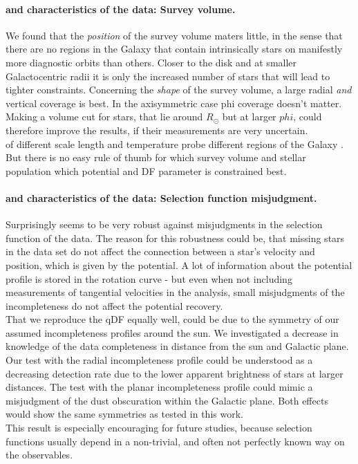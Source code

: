 \paragraph{\RM and characteristics of the data: Survey volume.} We found that the \emph{position} of the survey volume maters little, in the sense that there are no regions in the Galaxy that contain intrinsically stars on manifestly more diagnostic orbits than others. Closer to the disk and at smaller Galactocentric radii it is only the increased number of stars that will lead to tighter constraints. Concerning the \emph{shape} of the survey volume, a large radial \emph{and} vertical coverage is best. In the axisymmetric case phi coverage doesn't matter. Making a volume cut for stars, that lie around $R_\odot$ but at larger $phi$, could therefore improve the results, if their measurements are very uncertain.
\\\MAPs of different scale length and temperature probe different regions of the Galaxy \citep{bov13}. But there is no easy rule of thumb for which survey volume and stellar population which potential and DF parameter is constrained best.

\paragraph{\RM and characteristics of the data: Selection function misjudgment.} Surprisingly \RM seems to be very robust against misjudgments in the selection function of the data. The reason for this robustness could be, that missing stars in the data set do not affect the connection between a star's velocity and position, which is given by the potential. A lot of information about the potential profile is stored in the rotation curve - but even when not including measurements of tangential velocities in the analysis, small misjudgments of the incompleteness do not affect the potential recovery. 
\\That we reproduce the qDF equally well, could be due to the symmetry of our assumed incompleteness profiles around the sun. We investigated a decrease in knowledge of the data completeness in distance from the sun and Galactic plane. Our test with the radial incompleteness profile could be understood as a decreasing detection rate due to the lower apparent brightness of stars at larger distances. The test with the planar incompleteness profile could mimic a misjudgment of the dust obscuration within the Galactic plane. Both effects would show the same symmetries as tested in this work. 
\\This result is especially encouraging for future studies, because selection functions usually depend in a non-trivial, and often not perfectly known way on the observables.

